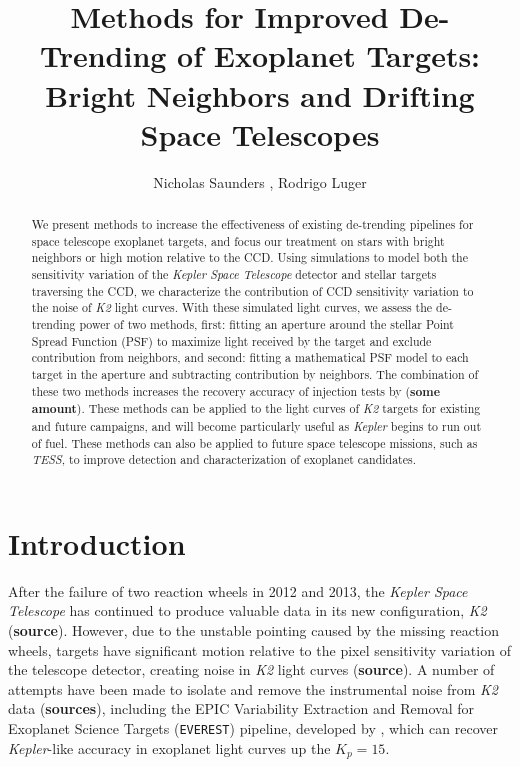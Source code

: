 \documentclass[12pt,preprint]{aastex}
\begin{document}
\title{
	Methods for Improved De-Trending of Exoplanet Targets: Bright Neighbors and Drifting Space Telescopes
}

\author{Nicholas Saunders , Rodrigo Luger }



\begin{abstract}

	We present methods to increase the effectiveness of existing de-trending pipelines for space telescope exoplanet targets, and focus our treatment on stars with bright neighbors or high motion relative to the CCD. Using simulations to model both the sensitivity variation of the \textit{Kepler Space Telescope} detector and stellar targets traversing the CCD, we characterize the contribution of CCD sensitivity variation to the noise of \textit{K2} light curves. With these simulated light curves, we assess the de-trending power of two methods, first: fitting an aperture around the stellar Point Spread Function (PSF) to maximize light received by the target and exclude contribution from neighbors, and second: fitting a mathematical PSF model to each target in the aperture and subtracting contribution by neighbors. The combination of these two methods increases the recovery accuracy of injection tests by (\textbf{some amount}). These methods can be applied to the light curves of \textit{K2} targets for existing and future campaigns, and will become particularly useful as \textit{Kepler} begins to run out of fuel. These methods can also be applied to future space telescope missions, such as \textit{TESS}, to improve detection and characterization of exoplanet candidates.

\end{abstract}

\section{Introduction}

After the failure of two reaction wheels in 2012 and 2013, the \textit{Kepler Space Telescope} has continued to produce valuable data in its new configuration, \textit{K2} (\textbf{source}). However, due to the unstable pointing caused by the missing reaction wheels, targets have significant motion relative to the pixel sensitivity variation of the telescope detector, creating noise in \textit{K2} light curves (\textbf{source}). A number of attempts have been made to isolate and remove the instrumental noise from \textit{K2} data (\textbf{sources}), including the EPIC Variability Extraction and Removal for Exoplanet Science Targets (\texttt{EVEREST}) pipeline, developed by \cite{2017arXiv170205488L}, which can recover \textit{Kepler}-like accuracy in exoplanet light curves up the $K_p = 15$.
\end{document}
